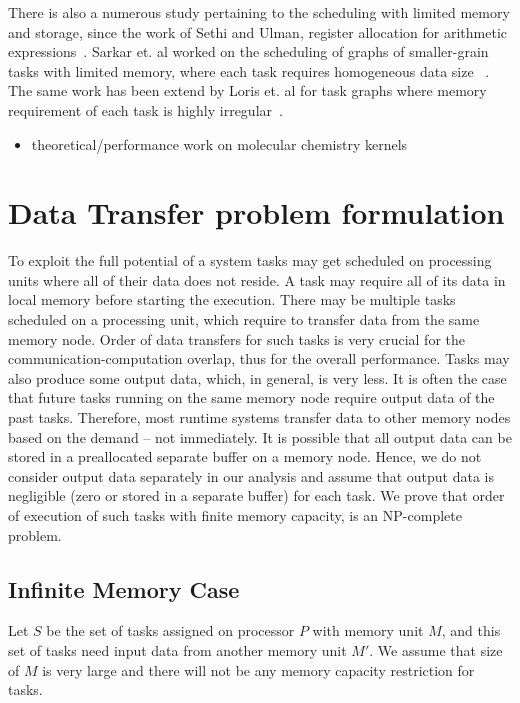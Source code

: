 \documentclass[runningheads]{llncs} %
\begin{document}
There is also a numerous study pertaining to the scheduling with limited memory and storage, since the work of Sethi and Ulman, register allocation for arithmetic expressions~\cite{Sethi:1970:GOC:321607.321620}.  Sarkar et. al  worked on the scheduling of graphs of smaller-grain tasks with limited memory, where each task requires homogeneous data size ~\cite{vsarkar-pact}. The same work has been extend by Loris et. al for task graphs where memory requirement of each task is highly irregular~\cite{loris-ipdps18}.



\begin{itemize}
	\item theoretical/performance work on molecular chemistry kernels
\end{itemize}


	\section{Data Transfer problem formulation}
	
	To exploit the full potential of a system tasks may get scheduled on processing
	units where all of their data does not reside. A task may require all of its data
	in local memory before starting the execution. There may be multiple tasks
	scheduled on a processing unit, which require to transfer data from the same
	memory node. Order of data transfers for such tasks is very crucial for the
	communication-computation overlap, thus for the overall performance. Tasks may
	also produce some output data, which, in general, is very less.  It is often the case that future tasks running on the same memory node require output data of the past tasks. Therefore, most runtime systems transfer data to other memory nodes based on the demand -- not immediately. It is possible that all output data can be stored in a preallocated separate buffer on a memory node. Hence, we do not consider output data separately in our analysis and assume that output data is negligible (zero or stored in a separate buffer) for each task. We prove that order of execution of such tasks with finite memory capacity, is an NP-complete problem.
	
	
	\subsection{Infinite Memory Case}
	Let $S$ be the set of tasks assigned on processor $P$ with memory unit $M$, and this set of tasks  need input data from another memory unit $M'$. We assume that size of $M$ is very large and there will not be any memory capacity restriction for tasks.
	
\end{document}
